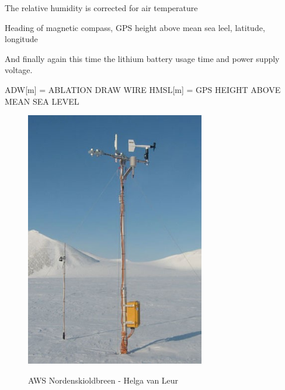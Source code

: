 \documentclass[11pt]{report}
\begin{document}
The relative humidity is corrected for air temperature

Heading of magnetic compass, GPS height above mean sea leel, latitude, longitude


And finally again this time the lithium battery usage time and power supply voltage. 
 
ADW[m]			= ABLATION DRAW WIRE
HMSL[m]		= GPS HEIGHT ABOVE MEAN SEA LEVEL 

\begin{figure}[h]
\raggedright
\begin{minipage}{0.5\textwidth}
\raggedright
    \includegraphics[width=0.7\textwidth]{nski.jpg}
    \label{fig:instrumentn}
    \caption{AWS Nordenskioldbreen - Helga van Leur}
\end{minipage}%
\begin{minipage}{0.5\textwidth}
\raggedright

\end{minipage}
\end{figure}
\end{document}
